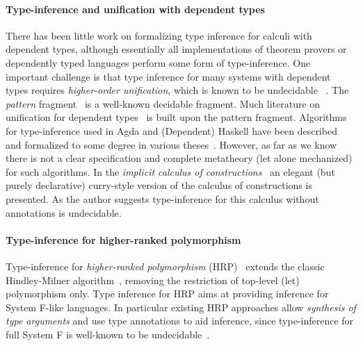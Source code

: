 \paragraph{Type-inference and unification with dependent types}
There has been little work on formalizing type inference for calculi
with dependent types, although essentially all implementations of
theorem provers or dependently typed languages perform some form of
type-inference.
One important challenge is that type inference for
many systems with dependent types requires \emph{higher-order unification},
which is known to be undecidable
~\cite{goldfarb1981undecidability}. The \textit{pattern}
fragment~\cite{miller1991unification} is a well-known decidable
fragment. Much literature on unification for dependent
types~\cite{reed2009higher,abel2011higher, gundry2013tutorial, Cockx:2016:UEP:2951913.2951917, ziliani2015unification, coen2004mathematical} is
built upon the pattern fragment. Algorithms for type-inference used in Agda and
(Dependent) Haskell have been described and formalized to some degree
in various theses~\cite{norell,gundry,dh}. However, as far as we know
there is not a clear specification and complete metatheory (let alone
mechanized) for such algorithms. In the \emph{implicit calculus of
 constructions}~\cite{Miquel01} an elegant (but purely declarative) curry-style
version of the calculus of constructions is presented. As the author
suggests type-inference for this calculus without annotations is undecidable.

\paragraph{Type-inference for higher-ranked polymorphism}
Type-inference for \emph{higher-ranked polymorphism}
(HRP)~\cite{dunfield2013complete,le2003ml,leijen2008hmf,vytiniotis2008fph,jones2007practical,Serrano2018, odersky1996putting}
extends the classic Hindley-Milner algorithm~\cite{hindley1969principal,milner1978theory,damas1982principal},
removing the restriction of top-level (let) polymorphism only. Type
inference for HRP aims at providing inference for System F-like
languages. In particular existing HRP approaches allow \emph{synthesis of type arguments}
and use type annotations to aid
inference, since type-inference for full System F is
well-known to be undecidable~\cite{wells1999typability}.

